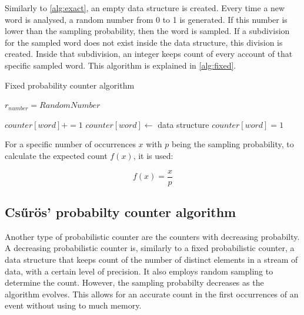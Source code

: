 Similarly to \autoref{alg:exact}, an empty data structure is created.
Every time a new word is analysed, a random number from 0 to 1 is generated.
If this number is lower than the sampling probability, then the word is sampled.
If a subdivision for the sampled word does not exist inside the data structure, this division is created.
Inside that subdivision, an integer keeps count of every account of that specific sampled word.
This algorithm is explained in \autoref{alg:fixed}.


\begin{algorithm}[ht!]
\caption{Fixed probability counter algorithm}
\label{alg:fixed}
\begin{algorithmic}



    $r_{number} = RandomNumber$

            \State $counter[word]+=1$
        \Else
            \State $counter[word] \gets$ data structure
            \State $counter[word]=1$
        \EndIf

    \EndIf
\EndFor
\end{algorithmic}
\end{algorithm}

For a specific number of occurrences $x$ with $p$ being the sampling probability, to calculate the expected count $f(x)$, it is used:

\begin{equation}
    f(x) = \frac{x}{p}
    \label{eq:fixed}
\end{equation}


\subsection{Csűrös' probabilty counter algorithm}
Another type of probabilistic counter are the counters with decreasing probabilty.
A decreasing probabilistic counter is, similarly to a fixed probabilistic counter, a data structure that keeps count of the number of distinct elements in a stream of data, with a certain level of precision. 
It also employs random sampling to determine the count.
However, the sampling probabilty decreases as the algorithm evolves.
This allows for an accurate count in the first occurrences of an event without using to much memory.

